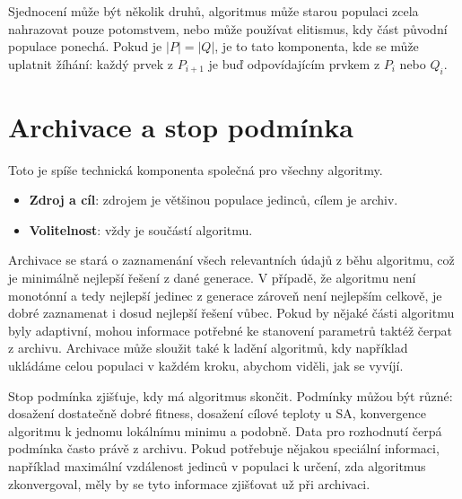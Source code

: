 Sjednocení může být několik druhů, algoritmus může starou populaci zcela nahrazovat pouze potomstvem, nebo může používat elitismus, kdy část původní populace ponechá. Pokud je $|P| = |Q|$, je to tato komponenta, kde se může uplatnit žíhání: každý prvek z $P_{i+1}$ je buď odpovídajícím prvkem z $P_i$ nebo $Q_i$.

\section{Archivace a stop podmínka}

Toto je spíše technická komponenta společná pro všechny algoritmy. 
\begin{itemize}
  \item \textbf{Zdroj a cíl}: zdrojem je většinou populace jedinců, cílem je archiv.
  \item \textbf{Volitelnost}: vždy je součástí algoritmu.
\end{itemize}

Archivace se stará o zaznamenání všech relevantních údajů z běhu algoritmu, což je minimálně nejlepší řešení z dané generace. V případě, že algoritmu není monotónní a tedy nejlepší jedinec z generace zároveň není nejlepším celkově, je dobré zaznamenat i dosud nejlepší řešení vůbec. Pokud by nějaké části algoritmu byly adaptivní, mohou informace potřebné ke stanovení parametrů taktéž čerpat z archivu. Archivace může sloužit také k ladění algoritmů, kdy například ukládáme celou populaci v každém kroku, abychom viděli, jak se vyvíjí.

Stop podmínka zjišťuje, kdy má algoritmus skončit. Podmínky můžou být různé: dosažení dostatečně dobré fitness, dosažení cílové teploty u SA, konvergence algoritmu k jednomu lokálnímu minimu a podobně. Data pro rozhodnutí čerpá podmínka často právě z archivu. Pokud potřebuje nějakou speciální informaci, například maximální vzdálenost jedinců v populaci k určení, zda algoritmus zkonvergoval, měly by se tyto informace zjišťovat už při archivaci.

